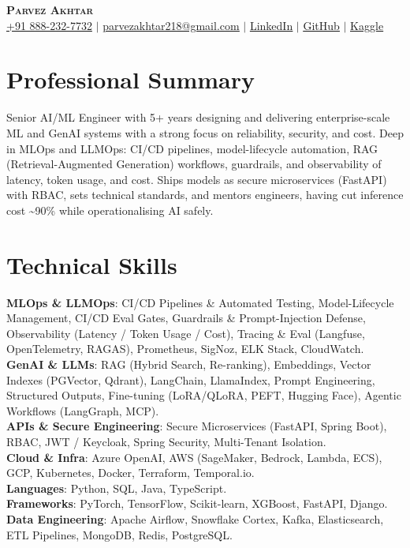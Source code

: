\documentclass[11pt,a4paper]{article}
\begin{document}
\begin{center}
    \textbf{\Huge \scshape Parvez Akhtar} \\ \vspace{1pt}
    \small \href{tel:+918882327732}{+91 888-232-7732} $\vert$ \href{mailto:parvezakhtar218@gmail.com}{\underline{parvezakhtar218@gmail.com}} $\vert$
    \href{https://www.linkedin.com/in/parvezakhtar/}{\underline{LinkedIn}} $\vert$
    \href{https://github.com/ipmob}{\underline{GitHub}} $\vert$
    \href{https://www.kaggle.com/parvez218}{\underline{Kaggle}}
\end{center}

\section{Professional Summary}
\small{Senior AI/ML Engineer with 5+ years designing and delivering enterprise-scale ML and GenAI systems with a strong focus on reliability, security, and cost. Deep in MLOps and LLMOps: CI/CD pipelines, model-lifecycle automation, RAG (Retrieval-Augmented Generation) workflows, guardrails, and observability of latency, token usage, and cost. Ships models as secure microservices (FastAPI) with RBAC, sets technical standards, and mentors engineers, having cut inference cost \textasciitilde{}90\% while operationalising AI safely.}

\section{Technical Skills}
 \begin{itemize}[leftmargin=0.15in, label={}]
    \small{\item{
     \textbf{MLOps \& LLMOps}{: CI/CD Pipelines \& Automated Testing, Model-Lifecycle Management, CI/CD Eval Gates, Guardrails \& Prompt-Injection Defense, Observability (Latency / Token Usage / Cost), Tracing \& Eval (Langfuse, OpenTelemetry, RAGAS), Prometheus, SigNoz, ELK Stack, CloudWatch.} \\
     \textbf{GenAI \& LLMs}{: RAG (Hybrid Search, Re-ranking), Embeddings, Vector Indexes (PGVector, Qdrant), LangChain, LlamaIndex, Prompt Engineering, Structured Outputs, Fine-tuning (LoRA/QLoRA, PEFT, Hugging Face), Agentic Workflows (LangGraph, MCP).} \\
     \textbf{APIs \& Secure Engineering}{: Secure Microservices (FastAPI, Spring Boot), RBAC, JWT / Keycloak, Spring Security, Multi-Tenant Isolation.} \\
     \textbf{Cloud \& Infra}{: Azure OpenAI, AWS (SageMaker, Bedrock, Lambda, ECS), GCP, Kubernetes, Docker, Terraform, Temporal.io.} \\
     \textbf{Languages}{: Python, SQL, Java, TypeScript.} \\
     \textbf{Frameworks}{: PyTorch, TensorFlow, Scikit-learn, XGBoost, FastAPI, Django.} \\
     \textbf{Data Engineering}{: Apache Airflow, Snowflake Cortex, Kafka, Elasticsearch, ETL Pipelines, MongoDB, Redis, PostgreSQL.}
    }}
 \end{itemize}
\end{document}
